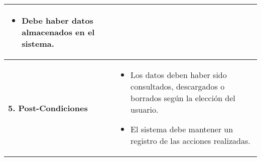 \documentclass[
11pt, %
codirector, %
]{charter}
\begin{document}
\begin{table}[h!]
\begin{tabular}{ | m{4.1cm} | m{10cm} | }
\begin{itemize}
			\item Debe haber datos almacenados en el sistema.
		\end{itemize} \\ \hline
		\textbf{5. Post-Condiciones} & 
		\begin{itemize}
			\item Los datos deben haber sido consultados, descargados o borrados según la elección del usuario.
			\item El sistema debe mantener un registro de las acciones realizadas.
		\end{itemize} \\ \hline
	\end{tabular}
	
\end{table}
\end{document}
